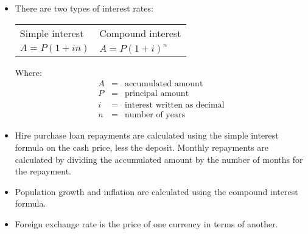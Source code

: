 
\begin{itemize}
    \item There are two types of interest rates:\\
    
    \begin{tabularx}{\textwidth}{XX}
	Simple	interest &	Compound interest\\
	$A = P (1 + in)$	&	$A = P(1 + i)^n$\\
    \end{tabularx}
    \par
    Where:
    \begin{eqnarray*}
	A &=& \mbox{accumulated amount}\\
	P &=& \mbox{principal amount}\\
	i &=& \mbox{interest written as decimal}\\
	n &=& \mbox{number of years}
    \end{eqnarray*}

    \item Hire purchase loan repayments are calculated using the simple interest formula on the cash price, less the deposit.  Monthly repayments are calculated by dividing the accumulated amount by the number of months for the repayment.

    \item Population growth and inflation are calculated using the compound interest formula.

    \item Foreign exchange rate is the price of one currency in terms of another.
\end{itemize}


